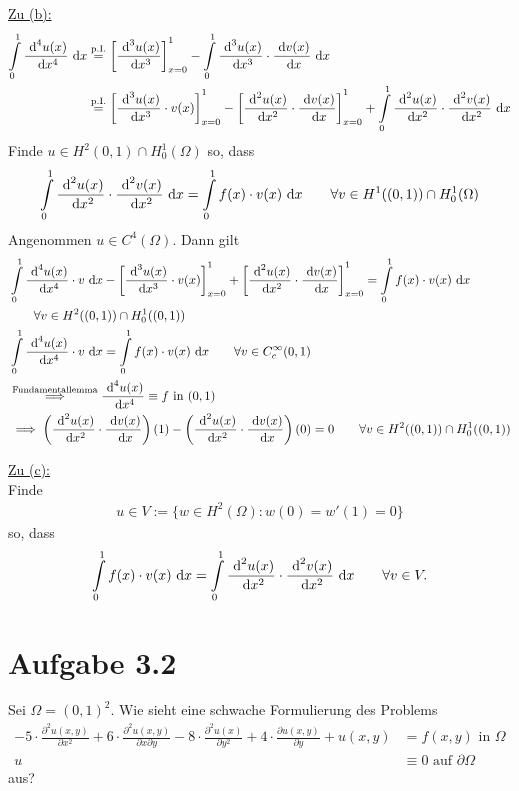 \documentclass[12pt,a4paper]{article}
\begin{document}
\begin{lösung}
\underline{Zu (b):}
\begin{align*}
\int\limits_0^1 \frac{\text{ d}^4 u(x)}{\text{ d} x^4}\text{ d} x
&\stackrel{\text{p.I.}}{=}
\left[\frac{\text{ d}^3 u(x)}{\text{ d} x^3}\right]_{x=0}^1-\int\limits_0^1 \frac{\text{ d}^3 u(x)}{\text{ d} x^3}\cdot\frac{\text{ d} v(x)}{\text{ d} x}\text{ d} x\\
&\stackrel{\text{p.I.}}{=}
\left[\frac{\text{ d}^3 u(x)}{\text{ d} x^3}\cdot v(x)\right]_{x=0}^1- 
\left[\frac{\text{ d}^2 u(x)}{\text{ d} x^2}\cdot\frac{\text{ d} v(x)}{\text{ d} x}\right]_{x=0}^1
+\int\limits_0^1 \frac{\text{ d}^2 u(x)}{\text{ d} x^2}\cdot\frac{\text{ d}^2 v(x)}{\text{ d} x^2}\text{ d} x\\
\end{align*}
Finde $u\in H^2(0,1)\cap H^1_0(\Omega)$ so, dass
\begin{align*}
\int\limits_0^1 \frac{\text{ d}^2 u(x)}{\text{ d} x^2}\cdot\frac{\text{ d}^2 v(x)}{\text{ d} x^2}\text{ d} x=\int\limits_0^1 f(x)\cdot v(x)\text{ d} x\qquad\forall v\in H^1((0,1))\cap H^1_0(\Omega)
\end{align*}
Angenommen $u\in C^4(\Omega)$. Dann gilt
\begin{align*}
&\int\limits_0^1 \frac{\text{ d}^4 u(x)}{\text{ d} x^4}\cdot v\text{ d} x-\left[\frac{\text{ d}^3 u(x)}{\text{ d} x^3}\cdot v(x)\right]_{x=0}^1+\left[\frac{\text{ d}^2 u(x)}{\text{ d} x^2}\cdot\frac{\text{ d} v(x)}{\text{ d} x}\right]_{x=0}^1=\int\limits_0^1 f(x)\cdot v(x)\text{ d} x
\\&\qquad\forall v\in H^2((0,1))\cap H_0^1((0,1))\\
&\int\limits_0^1 \frac{\text{ d}^4 u(x)}{\text{ d} x^4}\cdot v\text{ d} x
=\int\limits_0^1 f(x)\cdot v(x)\text{ d} x\qquad\forall v\in C_c^\infty(0,1)\\
&\stackrel{\text{Fundamentallemma}}{\implies}
\frac{\text{ d}^4 u(x)}{\text{ d} x^4}\equiv f\text{ in }(0,1)\\
&\implies
\left(\frac{\text{ d}^2 u(x)}{\text{ d} x^2}\cdot\frac{\text{ d} v(x)}{\text{ d} x}\right)(1)-\left(\frac{\text{ d}^2 u(x)}{\text{ d} x^2}\cdot\frac{\text{ d} v(x)}{\text{ d} x}\right)(0)=0\qquad\forall v\in H^2((0,1))\cap H^1_0((0,1))
\end{align*}

\underline{Zu (c):}\\
Finde
\begin{align*}
u\in V:=\big\lbrace w\in H^2(\Omega):w(0)=w'(1)=0\big\rbrace
\end{align*}
so, dass
\begin{align*}
\int\limits_0^1 f(x)\cdot v(x)\text{ d} x=\int\limits_0^1\frac{\text{ d}^2 u(x)}{\text{ d} x^2}\cdot\frac{\text{ d}^2 v(x)}{\text{ d} x^2}\text{ d} x\qquad\forall v\in V.
\end{align*}
\end{lösung}

\section*{Aufgabe 3.2}
Sei $\Omega=(0,1)^2$. Wie sieht eine schwache Formulierung des Problems
\begin{align*}
-5\cdot\frac{\partial^2 u(x,y)}{\partial x^2}+6\cdot\frac{\partial^2 u(x,y)}{\partial x\partial y}-8\cdot\frac{\partial^2 u(x)}{\partial y^2}+4\cdot\frac{\partial u(x,y)}{\partial y}+u(x,y)&=f(x,y) \text{ in }\Omega\\
u&\equiv 0\text{ auf }\partial\Omega
\end{align*}
aus?
\end{document}
